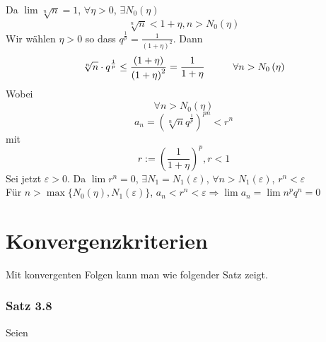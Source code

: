 Da $\lim\sqrt[n]{n}=1$, $\forall\eta >0$, $\exists N_0(\eta)$ $$\sqrt[n]{n}<1+\eta, n>N_0(\eta)$$
Wir wählen $\eta >0$ so dass ${q^{\frac{1}{p}}} = \frac{1}{{{{\left( {1 + \eta } \right)}^2}}}$. Dann
$$\sqrt[n]{n}\cdot q^{\frac{1}{p}}\leq\frac{\left( 1+\eta\right)}{\left( 1+\eta\right)^2}=\frac{1}{1+\eta}\hspace{10mm} \forall n>N_0\left(\eta\right)$$
Wobei $$\forall n>N_0\left(\eta\right)$$$$a_n=\left( \sqrt[n]{n}q^{\frac{1}{p}}\right)^{pn}<r^n$$ mit $$r:=\left( \frac{1}{1+\eta}\right)^p, r<1$$
Sei jetzt $\varepsilon>0$. Da $\lim r^n=0$, $\exists N_1=N_1(\varepsilon)$, $\forall n>N_1(\varepsilon)$, $r^n<\varepsilon$\\

\noindent Für $n>\max\{N_0\left(\eta\right), N_1(\varepsilon)\}$, $a_n<r^n<\varepsilon \Rightarrow \lim a_n=\lim n^pq^n=0$ 

\section{Konvergenzkriterien}
Mit konvergenten Folgen kann man  wie folgender Satz zeigt.
\subsubsection*{Satz 3.8}
Seien